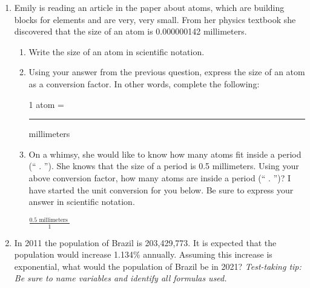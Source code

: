 \documentclass[12pt]{article}
\begin{document}
\begin{enumerate}
\newpage
\item  Emily is reading an article in the paper about atoms, which are building blocks for elements and are very, very small.  From her physics textbook she discovered that the size of an atom is 0.000000142 millimeters.  

\begin{enumerate}
\item Write the size of an atom in scientific notation.
\vfill
\item Using your answer from the previous question, express the size of an atom as a conversion factor.  In other words, complete the following:
\vspace{0.2in}
\begin{center} 1 atom = \rule{1.5in}{.01in} millimeters \end{center}
\vspace{0.2in}

\item On a whimsy, she would like to know how many atoms fit inside a period (`` . '').  She knows that the size of a period is 0.5 millimeters.  Using your above conversion factor, how many atoms are inside a period (`` . '')?  I have started the unit conversion for you below. Be sure to express your answer in scientific notation.

\vspace{0.1in}

$ \displaystyle \frac{ 0.5 \mbox{ millimeters } }{1 }$

\vfill



\end{enumerate}

\item In 2011 the population of Brazil is 203,429,773. It is expected that the population would increase 1.134\% annually.  Assuming this increase is exponential, what would the population of Brazil be in 2021?  \emph{Test-taking tip: Be sure to name variables and identify all formulas used.}


\vfill



\end{enumerate}
\end{document}
